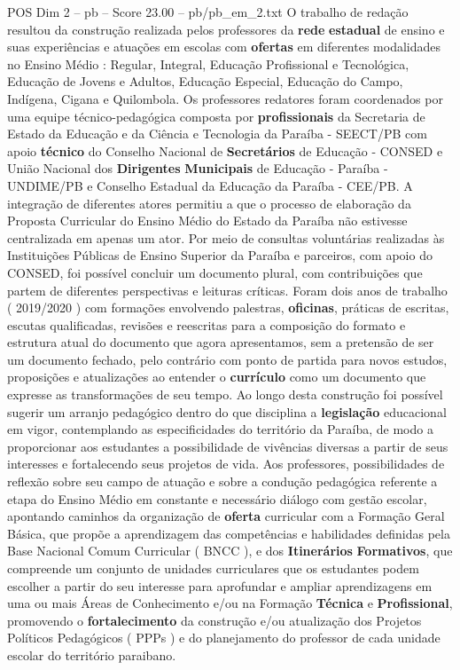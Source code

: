 \begin{textsample}{POS Dim 2 – pb – Score 23.00 – pb/pb\_em\_2.txt}
O trabalho de redação resultou da construção realizada pelos professores da \textbf{rede} \textbf{estadual} de ensino e suas experiências e atuações em escolas com \textbf{ofertas} em diferentes modalidades no Ensino Médio : Regular, Integral, Educação Profissional e Tecnológica, Educação de Jovens e Adultos, Educação Especial, Educação do Campo, Indígena, Cigana e Quilombola.
Os professores redatores foram coordenados por uma equipe técnico-pedagógica composta por \textbf{profissionais} da Secretaria de Estado da Educação e da Ciência e Tecnologia da Paraíba - SEECT/PB com apoio \textbf{técnico} do Conselho Nacional de \textbf{Secretários} de Educação - CONSED e União Nacional dos \textbf{Dirigentes} \textbf{Municipais} de Educação - Paraíba - UNDIME/PB e Conselho Estadual da Educação da Paraíba - CEE/PB.
A integração de diferentes atores permitiu a que o processo de elaboração da Proposta Curricular do Ensino Médio do Estado da Paraíba não estivesse centralizada em apenas um ator.
Por meio de consultas voluntárias realizadas às Instituições Públicas de Ensino Superior da Paraíba e parceiros, com apoio do CONSED, foi possível concluir um documento plural, com contribuições que partem de diferentes perspectivas e leituras críticas.
Foram dois anos de trabalho ( 2019/2020 ) com formações envolvendo palestras, \textbf{oficinas}, práticas de escritas, escutas qualificadas, revisões e reescritas para a composição do formato e estrutura atual do documento que agora apresentamos, sem a pretensão de ser um documento fechado, pelo contrário com ponto de partida para novos estudos, proposições e atualizações ao entender o \textbf{currículo} como um documento que expresse as transformações de seu tempo.
Ao longo desta construção foi possível sugerir um arranjo pedagógico dentro do que disciplina a \textbf{legislação} educacional em vigor, contemplando as especificidades do território da Paraíba, de modo a proporcionar aos estudantes a possibilidade de vivências diversas a partir de seus interesses e fortalecendo seus projetos de vida.
Aos professores, possibilidades de reflexão sobre seu campo de atuação e sobre a condução pedagógica referente a etapa do Ensino Médio em constante e necessário diálogo com gestão escolar, apontando caminhos da organização de \textbf{oferta} curricular com a Formação Geral Básica, que propõe a aprendizagem das competências e habilidades definidas pela Base Nacional Comum Curricular ( BNCC ), e dos \textbf{Itinerários} \textbf{Formativos}, que compreende um conjunto de unidades curriculares que os estudantes podem escolher a partir do seu interesse para aprofundar e ampliar aprendizagens em uma ou mais Áreas de Conhecimento e/ou na Formação \textbf{Técnica} e \textbf{Profissional}, promovendo o \textbf{fortalecimento} da construção e/ou atualização dos Projetos Políticos Pedagógicos ( PPPs ) e do planejamento do professor de cada unidade escolar do território paraibano.

\end{textsample}
